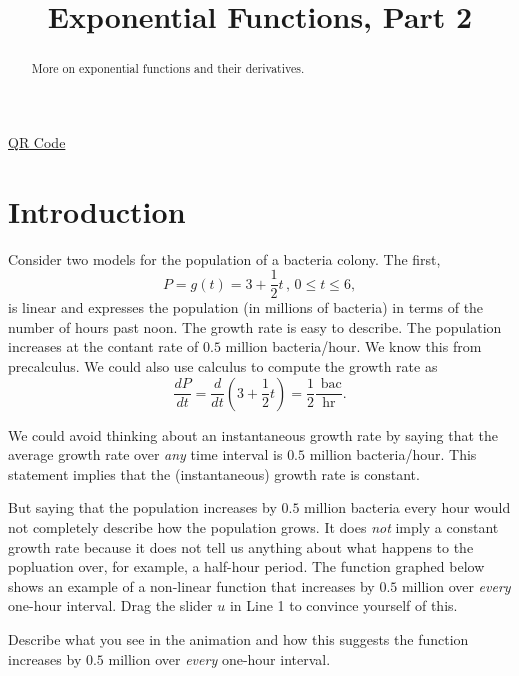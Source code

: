 \documentclass{ximera}
\title{Exponential Functions, Part 2}
\begin{document}
\begin{abstract}
More on exponential functions and their derivatives. 
\end{abstract}
\maketitle


\href{https://www.desmos.com/calculator/emp4pukecm}{QR Code}

 
\begin{onlineOnly}
    \begin{center}
\end{center}
\end{onlineOnly}


\section{Introduction}

Consider two models for the population of a bacteria colony. The first,
\[
      P = g(t) =3 +\frac{1}{2}t \, , \, 0\leq t \leq 6,
\]
is linear and expresses the population (in millions of bacteria) in terms of the number of hours past noon. The growth rate is easy to describe. The population increases at the contant rate of $0.5$ million bacteria/hour. We know this from precalculus. We could also use calculus to compute the growth rate as
\[
    \frac{dP}{dt} = \frac{d}{dt}\left(  3 +\frac{1}{2}t   \right) = \frac{1}{2} \frac{\text{ bac}}{\text{hr}}.
\]

We could avoid thinking about an instantaneous growth rate by saying that the average growth rate over \emph{any} time interval is $0.5$ million bacteria/hour. This statement implies that the (instantaneous) growth rate is constant. 

But saying that the population increases by $0.5$ million bacteria every hour would not completely describe how the population grows. It does \emph{not} imply a constant growth rate because it does not tell us anything about what happens to the popluation over, for example, a half-hour period. The function graphed below shows an example of a non-linear function that increases by $0.5$ million over \emph{every} one-hour interval. Drag the slider $u$ in Line 1 to convince yourself of this.

Describe what you see in the animation and how this suggests the function increases by $0.5$ million over \emph{every} one-hour interval.

\begin{freeResponse}
\end{freeResponse}
\end{document}
